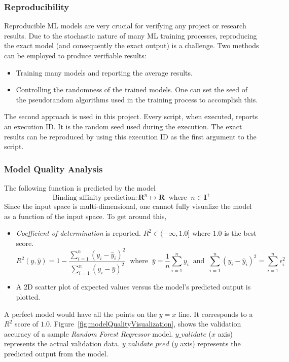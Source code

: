 \documentclass[11pt]{article}
\begin{document}
\subsubsection{Reproducibility}
Reproducible ML models are very crucial for verifying any project or research results. Due to the stochastic nature of many ML training processes, reproducing the exact model (and consequently the exact output) is a challenge. Two methods can be employed to produce verifiable results:
\begin{itemize}
\item Training many models and reporting the average results.
\item Controlling the randomness of the trained models. One can set the seed of the pseudorandom algorithms used in the training process to accomplish this.
\end{itemize}

The second approach is used in this project. Every script, when executed, reports an execution ID. It is the random seed used during the execution.  The exact results can be reproduced by using this execution ID as the first argument to the script.


\subsubsection{Model Quality Analysis}
The following function is predicted by the model
$$ \textrm{Binding affinity prediction} : \mathbf{R}^n \mapsto \mathbf{R} \;\; \textrm{where} \;\; n \in \mathbf{I}^+$$
Since the input space is multi-dimensional,  one cannot fully visualize the model as a function of the input space.
To get around this,
\begin{itemize}
\item \textit{Coefficient of determination} is reported. $R^2  \in (- \infty, 1.0]$ where $1.0$ is the best score. \cite{r_squared_score}
$$R^2(y, \hat{y}) = 1 - \frac{\sum_{i=1}^{n} (y_i - \hat{y}_i)^2}{\sum_{i=1}^{n} (y_i - \bar{y})^2} \;\; \textrm{where} \;\; \bar{y} = \frac{1}{n} \sum_{i=1}^{n} y_i \;\;
\textrm{and} \;\; \sum_{i=1}^{n} (y_i - \hat{y}_i)^2 = \sum_{i=1}^{n} \epsilon_i^2$$

\item A 2D scatter plot of expected values versus the model's predicted output is plotted.
\end{itemize}

A perfect model would have all the points on the $y = x$ line. It corresponds to a $R^2$ score of $1.0$. 
Figure~\ref{fig:modelQualityVisualization},  shows the validation accuracy of a sample \textit{Random Forest Regressor} model.
$y\_validate$ ($x$ axis) represents the actual validation data.
$y\_validate\_pred$ ($y$ axis) represents the predicted output from the model.
\end{document}
